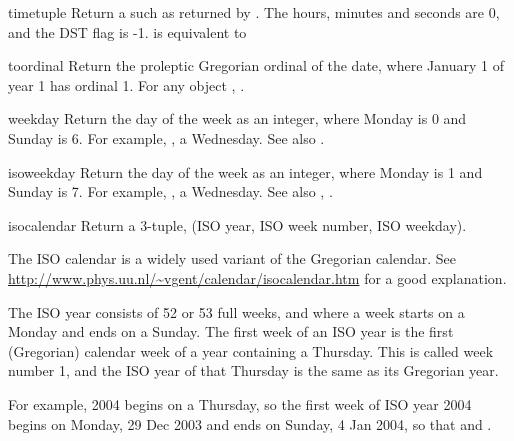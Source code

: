 \begin{methoddesc}{timetuple}{}
  Return a  such as returned by
  .  The hours, minutes and seconds are
  0, and the DST flag is -1.
   is equivalent to
\end{methoddesc}

\begin{methoddesc}{toordinal}{}
  Return the proleptic Gregorian ordinal of the date, where January 1
  of year 1 has ordinal 1.  For any  object ,
  .
\end{methoddesc}

\begin{methoddesc}{weekday}{}
  Return the day of the week as an integer, where Monday is 0 and
  Sunday is 6.  For example, , a
  Wednesday.
  See also .
\end{methoddesc}

\begin{methoddesc}{isoweekday}{}
  Return the day of the week as an integer, where Monday is 1 and
  Sunday is 7.  For example, , a
  Wednesday.
  See also , .
\end{methoddesc}

\begin{methoddesc}{isocalendar}{}
  Return a 3-tuple, (ISO year, ISO week number, ISO weekday).

  The ISO calendar is a widely used variant of the Gregorian calendar.
  See \url{http://www.phys.uu.nl/~vgent/calendar/isocalendar.htm}
  for a good explanation.

  The ISO year consists of 52 or 53 full weeks, and where a week starts
  on a Monday and ends on a Sunday.  The first week of an ISO year is
  the first (Gregorian) calendar week of a year containing a Thursday.
  This is called week number 1, and the ISO year of that Thursday is
  the same as its Gregorian year.

  For example, 2004 begins on a Thursday, so the first week of ISO
  year 2004 begins on Monday, 29 Dec 2003 and ends on Sunday, 4 Jan
  2004, so that
  and
  .
\end{methoddesc}

